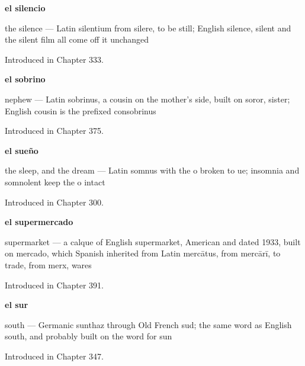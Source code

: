 \noindent\begin{minipage}[t]{\linewidth}
\raggedright
\textbf{el silencio}\par
\small the silence — Latin silentium from silere, to be still; English silence, silent and the silent film all come off it unchanged\par
\footnotesize Introduced in Chapter 333.
\end{minipage}\par\medskip

\noindent\begin{minipage}[t]{\linewidth}
\raggedright
\textbf{el sobrino}\par
\small nephew — Latin sobrinus, a cousin on the mother's side, built on soror, sister; English cousin is the prefixed consobrinus\par
\footnotesize Introduced in Chapter 375.
\end{minipage}\par\medskip

\noindent\begin{minipage}[t]{\linewidth}
\raggedright
\textbf{el sueño}\par
\small the sleep, and the dream — Latin somnus with the o broken to ue; insomnia and somnolent keep the o intact\par
\footnotesize Introduced in Chapter 300.
\end{minipage}\par\medskip

\noindent\begin{minipage}[t]{\linewidth}
\raggedright
\textbf{el supermercado}\par
\small supermarket — a calque of English supermarket, American and dated 1933, built on mercado, which Spanish inherited from Latin mercātus, from mercārī, to trade, from merx, wares\par
\footnotesize Introduced in Chapter 391.
\end{minipage}\par\medskip

\noindent\begin{minipage}[t]{\linewidth}
\raggedright
\textbf{el sur}\par
\small south — Germanic sunthaz through Old French sud; the same word as English south, and probably built on the word for sun\par
\footnotesize Introduced in Chapter 347.
\end{minipage}\par\medskip

